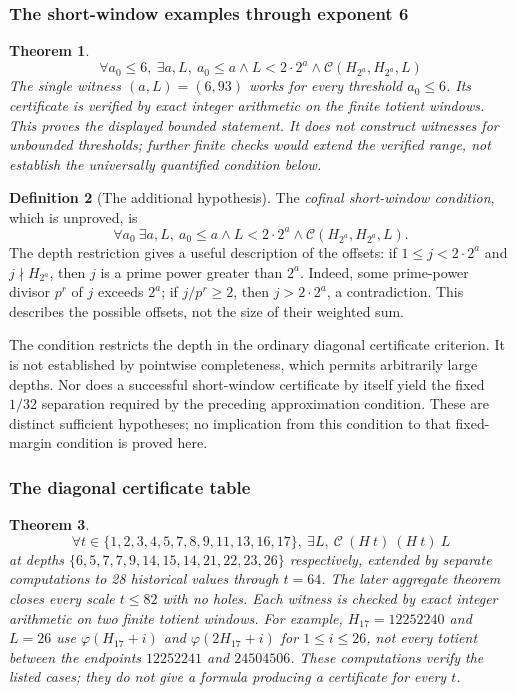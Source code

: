 \documentclass[11pt]{article}
\theoremstyle{plain}
\newtheorem{thm}{Theorem}[section]
\theoremstyle{definition}
\newtheorem{defn}[thm]{Definition}
\theoremstyle{remark}
\begin{document}
\subsubsection{The short-window examples through exponent 6}

\begin{thm}\label{thm:short-window-examples-through-exponent}
\[
  \forall a_0\le 6,\ \exists a,L,\ a_0\le a \wedge L < 2\cdot 2^a \wedge
  \mathcal C(H_{2^a},H_{2^a},L)
\]
The single witness $(a,L)=(6,93)$ works for every threshold $a_0\le6$.
Its certificate is verified by exact integer arithmetic on the finite
totient windows.
This proves the displayed bounded statement. It does not construct
witnesses for unbounded thresholds; further finite checks would extend
the verified range, not establish the universally quantified condition below.
\end{thm}

\begin{defn}[The additional hypothesis]
The \emph{cofinal short-window condition}, which is unproved, is
\[
  \forall a_0\ \exists a,L,\ a_0\le a \wedge L < 2\cdot 2^a \wedge
  \mathcal C(H_{2^a},H_{2^a},L) .
\]
The depth restriction gives a useful description of the offsets:
if $1\le j<2\cdot2^a$ and $j\nmid H_{2^a}$, then $j$ is a prime
power greater than $2^a$. Indeed, some prime-power divisor $p^r$ of
$j$ exceeds $2^a$; if $j/p^r\ge2$, then $j>2\cdot2^a$, a contradiction.
This describes the possible offsets, not the size of their weighted sum.

The condition restricts the depth in the ordinary diagonal certificate
criterion. It is not established by pointwise completeness, which permits
arbitrarily large depths. Nor does a successful short-window certificate
by itself yield the fixed $1/32$ separation required by the preceding
approximation condition. These are distinct sufficient hypotheses;
no implication from this condition to that fixed-margin condition is
proved here.
\end{defn}

\subsubsection{The diagonal certificate table}

\begin{thm}\label{thm:diagonal-certificate-table}
\[
  \forall t\in\{1,2,3,4,5,7,8,9,11,13,16,17\},\ \exists L,\
  \mathcal{C}\ ({H}\ t)\ ({H}\ t)\ L
\]
at depths $\{6,5,7,7,9,14,15,14,21,22,23,26\}$ respectively, extended by separate
computations to 28 historical values through $t=64$.
The later aggregate theorem closes every scale $t\le82$ with no holes.
Each witness is checked by exact integer arithmetic on two finite totient
windows. For example, $H_{17}=12252240$ and $L=26$ use
$\varphi(H_{17}+i)$ and $\varphi(2H_{17}+i)$ for $1\le i\le26$,
not every totient between the endpoints $12252241$ and $24504506$.
These computations verify the listed cases; they do not give a formula
producing a certificate for every $t$.
\end{thm}
\end{document}
